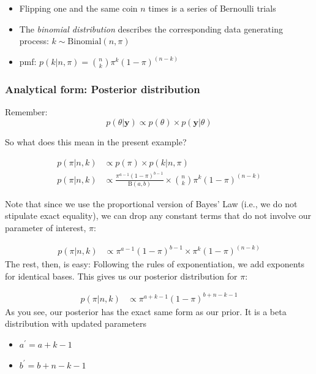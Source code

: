 \documentclass[
  11pt,
]{article}
\providecommand{\tightlist}{%
  \setlength{\itemsep}{0pt}\setlength{\parskip}{0pt}}
\begin{document}
\begin{itemize}
\tightlist
\item
  Flipping one and the same coin \(n\) times is a series of Bernoulli trials
\item
  The \emph{binomial distribution} describes the corresponding data generating process: \(k \sim \text{Binomial}(n, \pi)\)
\item
  pmf: \(p(k|n, \pi) = {n \choose k} \pi^k (1-\pi)^{(n-k)}\)
\end{itemize}

\hypertarget{analytical-form-posterior-distribution}{%
\subsubsection{Analytical form: Posterior distribution}\label{analytical-form-posterior-distribution}}

Remember: \[p(\theta | \mathbf{y}) \propto p(\theta) \times p(\mathbf{y}|\theta)\]

So what does this mean in the present example?

\[\begin{split}p(\pi|n,k) & \propto p(\pi) \times p(k|n, \pi) \\
 p(\pi|n,k) & \propto \frac{\pi^{a-1} (1- \pi)^{b-1}}{\text{B}(a, b)} \times {n \choose k} \pi^k (1-\pi)^{(n-k)}\end{split}\]

Note that since we use the proportional version of Bayes' Law (i.e., we do not stipulate exact equality), we can drop any constant terms that do not involve our parameter of interest, \(\pi\):

\[\begin{split}p(\pi|n,k) & \propto \pi^{a-1} (1- \pi)^{b-1} \times \pi^k (1-\pi)^{(n-k)}\end{split}\]
The rest, then, is easy: Following the rules of exponentiation, we add exponents for identical bases. This gives us our posterior distribution for \(\pi\):

\[\begin{split}p(\pi|n,k) & \propto \pi^{a+k-1} (1- \pi)^{b+n-k-1}\end{split}\]
As you see, our posterior has the exact same form as our prior. It is a beta distribution with updated parameters

\begin{itemize}
\tightlist
\item
  \(a^{\prime} = a+k-1\)
\item
  \(b^{\prime} = b+n-k-1\)
\end{itemize}
\end{document}
